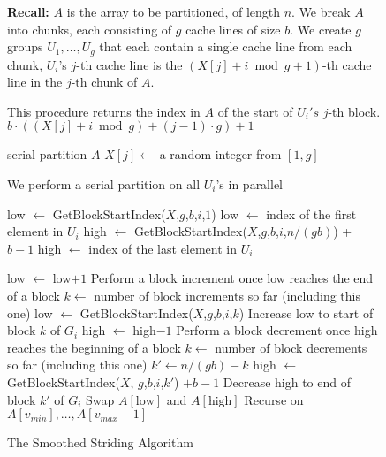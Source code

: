 \documentclass[twocolumn,10pt]{article}
\theoremstyle{remark}
\theoremstyle{remark}
\begin{document}
\begin{figure*}
  \caption{The Smoothed Striding Algorithm}
	\label{alg:parallelPartition_smoothedStriding}
	\begin{algorithmic}%
    \State \textbf{Recall:} 
    \State $A$ is the array to be partitioned, of length $n$. 
    \State We break $A$ into chunks, each consisting of $g$ cache lines of size $b$.
    \State We create $g$ groups $U_1,\ldots, U_g$ that each contain a single cache line from each chunk,
    \State $U_i$'s $j$-th cache line is the $(X[j]+i \bmod g + 1)$-th cache line in the $j$-th chunk of $A$.
    \State

      \Comment This procedure returns the index in $A$ of the start of $U_i's$ $j$-th block.
      \State\Return $b\cdot ((X[j] + i \bmod g) +(j-1)\cdot g)+1$
    \EndProcedure
    \State

        \State serial partition $A$
      \Else
          \State $X[j] \gets$ a random integer from $[1,g]$ 
        \EndFor

         \Comment We perform a serial partition on all $U_i$'s in parallel

          \State low $\gets$ GetBlockStartIndex($X$,$g$,$b$,$i$,$1$)
          \Comment low $\gets$ index of the first element in $U_i$
          \State high $\gets$ GetBlockStartIndex($X$,$g$,$b$,$i$,$n/(gb)$) + $b-1$
          \Comment high $\gets$ index of the last element in $U_i$

              \State low $\gets$ low$+1$
                \Comment Perform a block increment once low reaches the end of a block
                \State $k \gets $ number of block increments so far (including this one)
                \State low $\gets$ GetBlockStartIndex($X$,$g$,$b$,$i$,$k$)
                \Comment Increase low to start of block $k$ of $G_i$
              \EndIf
            \EndWhile
              \State high $\gets$ high$-1$
                \Comment Perform a block decrement once high reaches the beginning of a block
                \State $k \gets $ number of block decrements so far (including this one)
                \State $k' \gets n/(gb) - k$
                \State high $\gets$ GetBlockStartIndex($X$, $g$,$b$,$i$,$k'$) $+b-1$
                \Comment Decrease high to end of block $k'$ of $G_i$
              \EndIf
            \EndWhile
            \State Swap $A[\text{low}]$ and $A[\text{high}]$
          \EndWhile
        \EndFor
        \State Recurse on $A[v_{min}],\ldots,A[v_{max}-1]$
      \EndIf
    \EndProcedure
	\end{algorithmic}	
\end{figure*}
\end{document}
